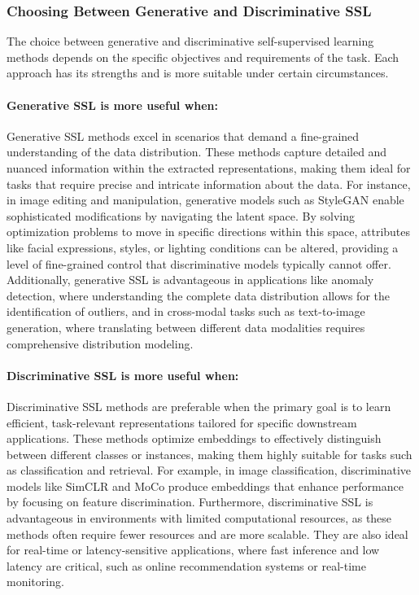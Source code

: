 \subsubsection{Choosing Between Generative and Discriminative SSL}

The choice between generative and discriminative self-supervised learning methods depends on the specific objectives and requirements of the task. Each approach has its strengths and is more suitable under certain circumstances.

\paragraph{Generative SSL is more useful when:}

Generative SSL methods excel in scenarios that demand a fine-grained understanding of the data distribution. These methods capture detailed and nuanced information within the extracted representations, making them ideal for tasks that require precise and intricate information about the data. For instance, in image editing and manipulation, generative models such as StyleGAN \citep{karras2019style, karras2020analyzing} enable sophisticated modifications by navigating the latent space. By solving optimization problems to move in specific directions within this space, attributes like facial expressions, styles, or lighting conditions can be altered, providing a level of fine-grained control that discriminative models typically cannot offer. Additionally, generative SSL is advantageous in applications like anomaly detection, where understanding the complete data distribution allows for the identification of outliers, and in cross-modal tasks such as text-to-image generation, where translating between different data modalities requires comprehensive distribution modeling.

\paragraph{Discriminative SSL is more useful when:}

Discriminative SSL methods are preferable when the primary goal is to learn efficient, task-relevant representations tailored for specific downstream applications. These methods optimize embeddings to effectively distinguish between different classes or instances, making them highly suitable for tasks such as classification and retrieval. For example, in image classification, discriminative models like SimCLR \citep{chen2020simple} and MoCo \citep{he2020momentum} produce embeddings that enhance performance by focusing on feature discrimination. Furthermore, discriminative SSL is advantageous in environments with limited computational resources, as these methods often require fewer resources and are more scalable. They are also ideal for real-time or latency-sensitive applications, where fast inference and low latency are critical, such as online recommendation systems or real-time monitoring.

